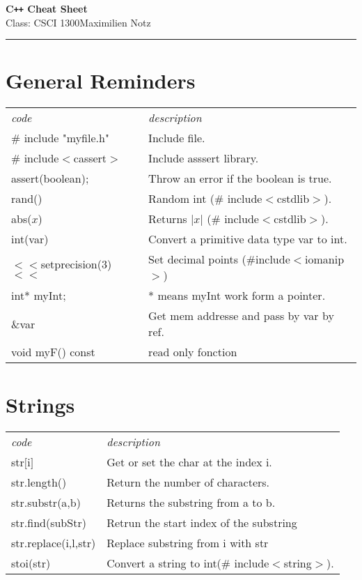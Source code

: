 \documentclass[5pt]{article}
\begin{document}
\begin{center}
     \Large{\textbf{C\texttt{++} Cheat Sheet}}\\
     \small{Class: CSCI 1300}\hfill\small{\textcopyright Maximilien Notz \the\year{}}
     \noindent\rule{20cm}{0.4pt}
\end{center}
\begin{multicols}{2}
\setcounter{secnumdepth}{0}


\section{General Reminders}
\begin{tabular}{ll}
\emph{code} & \emph{description}\\
\# include "myfile.h" & Include file.\\
\# include$<$cassert$>$ & Include asssert library.\\
assert(boolean); & Throw an error if the boolean is true.\\
rand() & Random int (\# include$<$cstdlib$>$).\\
abs($x$) & Returns $|x|$ (\# include$<$cstdlib$>$).\\
int(var) & Convert a primitive data type var to int.\\
$<<$setprecision(3)$<<$& Set decimal points (\#include$<$iomanip$>$)\\
int* myInt; & * means myInt work form a pointer.\\
\&var & Get mem addresse and pass by var by ref.\\
void myF() const & read only fonction\\
\end{tabular}


\section{Strings}
\begin{tabular}{ll}
\emph{code} & \emph{description}\\
str$[$i$]$ & Get or set the char at the index i.\\
str.length() & Return the number of characters.\\
str.substr(a,b) & Returns the substring from a to b.\\
str.find(subStr) & Retrun the start index of the substring\\
str.replace(i,l,str)& Replace substring from i with str\\
stoi(str) & Convert a string to int(\# include$<$string$>$).
\end{tabular}


\end{multicols}
\end{document}
